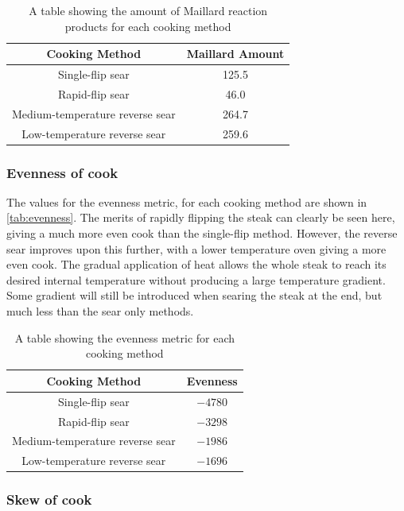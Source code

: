 \documentclass[11pt]{article}
\begin{document}
	\begin{table}[H]
		\centering
		\begin{tabular}{c|c}
			\textbf{Cooking Method} & \textbf{Maillard Amount} \\
			\hline
			Single-flip sear & 125.5 \\
			Rapid-flip sear & 46.0 \\
			Medium-temperature reverse sear & 264.7 \\
			Low-temperature reverse sear & 259.6
		\end{tabular}
		\caption{A table showing the amount of Maillard reaction products for each cooking method}
		\label{tab:maillard_products}
	\end{table}
	
	\subsubsection{Evenness of cook}
	
	The values for the evenness metric, for each cooking method are shown in \autoref{tab:evenness}. The merits of rapidly flipping the steak can clearly be seen here, giving a much more even cook than the single-flip method. However, the reverse sear improves upon this further, with a lower temperature oven giving a more even cook. The gradual application of heat allows the whole steak to reach its desired internal temperature without producing a large temperature gradient. Some gradient will still be introduced when searing the steak at the end, but much less than the sear only methods.
	
	\begin{table}[H]
		\centering
		\begin{tabular}{c|c}
			\textbf{Cooking Method} & \textbf{Evenness} \\
			\hline
			Single-flip sear & $-4780$ \\
			Rapid-flip sear & $-3298$ \\
			Medium-temperature reverse sear & $-1986$ \\
			Low-temperature reverse sear & $-1696$
		\end{tabular}
		\caption{A table showing the evenness metric for each cooking method}
		\label{tab:evenness}
	\end{table}
	
	\subsubsection{Skew of cook}
	
\end{document}
